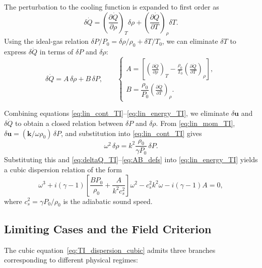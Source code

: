 The perturbation to the cooling function is expanded to first order as
\begin{equation}
\delta\dot{Q} = 
\left(\frac{\partial \dot{Q}}{\partial \rho}\right)_T \delta\rho
+ \left(\frac{\partial \dot{Q}}{\partial T}\right)_\rho \delta T.
\label{eq:deltaQ_TI}
\end{equation}
Using the ideal-gas relation $\delta P/P_0 = \delta\rho/\rho_0 + \delta T/T_0$, we can eliminate $\delta T$ to express $\delta\dot{Q}$ in terms of $\delta P$ and $\delta\rho$:
\begin{equation}
\delta\dot{Q}
= A\,\delta\rho + B\,\delta P,
\qquad
\begin{cases}
A = 
\left[\left(\frac{\partial \dot{Q}}{\partial \rho}\right)_T
- \frac{\rho_0}{T_0}\left(\frac{\partial \dot{Q}}{\partial T}\right)_\rho\right],\\[6pt]
B = \dfrac{\rho_0}{P_0}\left(\frac{\partial \dot{Q}}{\partial T}\right)_\rho.
\end{cases}
\label{eq:AB_defs}
\end{equation}

Combining equations \eqref{eq:lin_cont_TI}–\eqref{eq:lin_energy_TI}, we eliminate $\delta\mathbf{u}$ and $\delta\dot{Q}$ to obtain a closed relation between $\delta P$ and $\delta\rho$.  
From \eqref{eq:lin_mom_TI}, $\delta\mathbf{u} = (\mathbf{k}/\omega\rho_0)\,\delta P$, and substitution into \eqref{eq:lin_cont_TI} gives
\begin{equation}
\omega^2\,\delta\rho = k^2 \frac{\rho_0}{\gamma P_0}\,\delta P.
\label{eq:cont_mom_combined}
\end{equation}
Substituting this and \eqref{eq:deltaQ_TI}–\eqref{eq:AB_defs} into \eqref{eq:lin_energy_TI} yields a cubic dispersion relation of the form
\begin{equation}
\boxed{
\omega^3 + i(\gamma - 1)\left[\frac{B P_0}{\rho_0} + \frac{A}{k^2 c_s^2}\right]\omega^2
- c_s^2 k^2 \omega
- i(\gamma - 1)A = 0,
}
\label{eq:TI_dispersion_cubic}
\end{equation}
where $c_s^2 = \gamma P_0 / \rho_0$ is the adiabatic sound speed.

\subsection*{Limiting Cases and the Field Criterion}

The cubic equation~\eqref{eq:TI_dispersion_cubic} admits three branches corresponding to different physical regimes:

